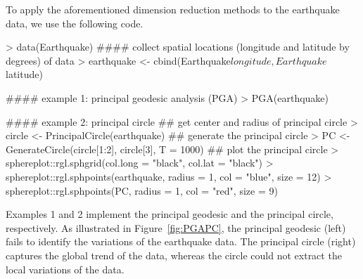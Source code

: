To apply the aforementioned dimension reduction methods to the earthquake data, we use the following code. %
\begin{example}
   > data(Earthquake)
   #### collect spatial locations (longitude and latitude by degrees) of data
   > earthquake <- cbind(Earthquake$longitude, Earthquake$latitude)  

   #### example 1: principal geodesic analysis (PGA)
   > PGA(earthquake)

   #### example 2: principal circle
   ## get center and radius of principal circle
   > circle <- PrincipalCircle(earthquake)    
   ## generate the principal circle
   > PC <- GenerateCircle(circle[1:2], circle[3], T = 1000)   
   ## plot the principal circle
   > sphereplot::rgl.sphgrid(col.long = "black", col.lat = "black")                                  
   > sphereplot::rgl.sphpoints(earthquake, radius = 1, col = "blue", size = 12)
   > sphereplot::rgl.sphpoints(PC, radius = 1, col = "red", size = 9)
\end{example}
Examples 1 and 2 implement the principal geodesic and the principal circle, respectively. As illustrated in Figure~\ref{fig:PGAPC}, the principal geodesic (left) fails to identify the variations of the earthquake data. The principal circle (right) captures the global trend of the data, whereas the circle could not extract the local variations of the data.

